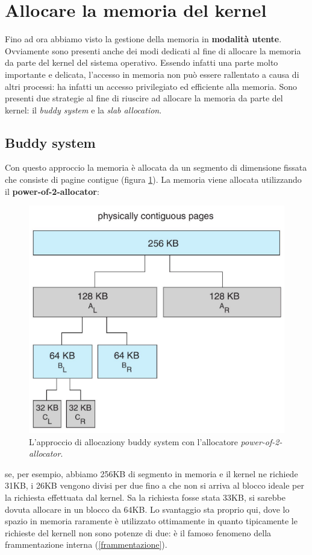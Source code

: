 % 
\section{Allocare la memoria del kernel}
Fino ad ora abbiamo visto la gestione della memoria in \textbf{modalità utente}. Ovviamente sono presenti anche dei modi dedicati al fine di allocare la memoria da parte del kernel del sistema operativo. Essendo infatti una parte molto importante e delicata, l'accesso in memoria non può essere rallentato a causa di altri processi: ha infatti un accesso privilegiato ed efficiente alla memoria. Sono presenti due strategie al fine di riuscire ad allocare la memoria da parte del kernel: il \textit{buddy system} e la \textit{slab allocation}.

% 
\subsection{Buddy system}
Con questo approccio la memoria è allocata da un segmento di dimensione fissata che consiste di pagine contigue (figura \ref{fig:buddy_system}). La memoria viene allocata utilizzando il \textbf{power-of-2-allocator}:
\begin{figure}[h]
    \centering
    \includegraphics[width = .4\textwidth]{../res/imgs/virtual memory/buddy_system.png}
    \caption{L'approccio di allocaziony buddy system con l'allocatore \textit{power-of-2-allocator}.}
    \label{fig:buddy_system}
\end{figure}
se, per esempio, abbiamo 256KB di segmento in memoria e il kernel ne richiede 31KB, i 26KB vengono divisi per due fino a che non si arriva al blocco ideale per la richiesta effettuata dal kernel. Sa la richiesta fosse stata 33KB, si sarebbe dovuta allocare in un blocco da 64KB. Lo svantaggio sta proprio qui, dove lo spazio in memoria raramente è utilizzato ottimamente in quanto tipicamente le richieste del kernell non sono potenze di due: è il famoso fenomeno della frammentazione interna (\ref{frammentazione}).

% 
